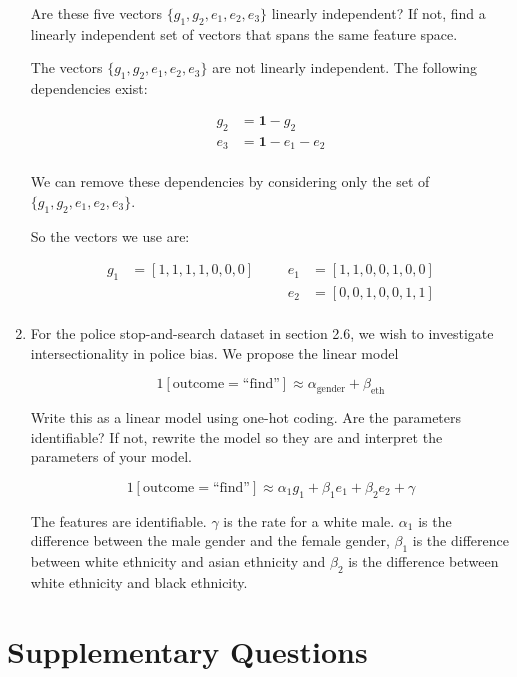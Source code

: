 \documentclass[10pt,\jkfside,a4paper]{article}
\begin{document}
\begin{enumerate}
Are these five vectors $\{g_1, g_2, e_1, e_2, e_3\}$ linearly independent?
If not, find a linearly independent set of vectors that spans the same
feature space.

The vectors $\{g_1, g_2, e_1, e_2, e_3\}$ are not linearly independent. The
following dependencies exist:

\[
\begin{split}
g_2 &= \mathbf{1} - g_2 \\
e_3 &= \mathbf{1} - e_1 - e_2 \\
\end{split}
\]

We can remove these dependencies by considering only the set of
$\{g_1, g_2, e_1, e_2, e_3\}$.

So the vectors we use are:

\begin{align*}
g_1 &= [1, 1, 1, 1, 0, 0, 0] & & & e_1 &= [1, 1, 0, 0, 1, 0, 0] \\
	&						 & & & e_2 &= [0, 0, 1, 0, 0, 1, 1] \\
\end{align*}

\item For the police stop-and-search dataset in section 2.6, we wish to
investigate intersectionality in police bias. We propose the linear model

\[
1[\text{outcome}=\text{``find''}] \approx \alpha_{\text{gender}} +
\beta_{\text{eth}}
\]

Write this as a linear model using one-hot coding. Are the parameters
identifiable? If not, rewrite the model so they are and interpret the
parameters of your model.

\[
1[\text{outcome}=\text{``find''}] \approx \alpha_1 g_1 + \beta_1 e_1 +
\beta_2 e_2 + \gamma
\]

The features are identifiable. $\gamma$ is the rate for a white male.
$\alpha_1$ is the difference between the male gender and the female gender,
$\beta_1$ is the difference between white ethnicity and asian ethnicity and
$\beta_2$ is the difference between white ethnicity and black ethnicity.

\end{enumerate}

\section{Supplementary Questions}
\end{document}

